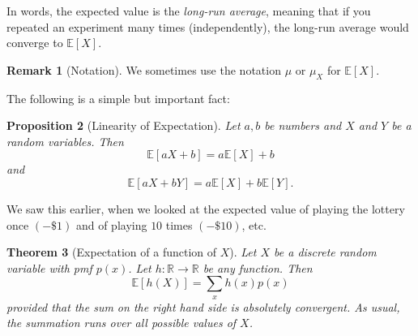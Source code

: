 \documentclass[10pt]{article}
\newtheorem{theorem}{Theorem}
\newtheorem{proposition}[theorem]{Proposition}
\theoremstyle{definition}
\newtheorem{remark}[theorem]{Remark}
\newcommand{\1}[1]{\textbf{1}_{\left[#1\right]}} %
\def\R{\mathbb{R}} %
\def\E{\mathbb{E}} %
\begin{document}
In words, the expected value is the \textit{long-run average}, meaning that if
you repeated an experiment many times (independently), the long-run average
would converge to $\E\left[X \right]$.

\begin{remark}[Notation]
  We sometimes use the notation $\mu$ or $\mu_{X}$ for $\E\left[X \right]$.
\end{remark}

The following is a simple but important fact:

\begin{proposition}[Linearity of Expectation]
  \label{prop:linearity-of-expectation}
  Let $a,b$ be numbers and $X$ and $Y$ be a random variables. Then
  \begin{equation*}
    \E\left[aX+b \right] = a \E\left[X \right] +b
  \end{equation*}
  and
  \begin{equation*}
    \E\left[aX+bY \right] = a\E\left[X \right]+ b\E\left[Y \right].
  \end{equation*}
\end{proposition}
We saw this earlier, when we looked at the expected value of playing the
lottery once $(-\$1)$ and of playing $10$ times $(-\$10)$, etc.

\begin{theorem}[Expectation of a function of $X$] 
  \label{thm:LOTUS-discrete-case}
  Let $X$ be a discrete random variable with pmf $p(x)$. Let $h:\R \to \R$ be any function. Then
  \begin{equation*}
    \E\left[h(X) \right] = \sum_{x} h(x)p(x) 
  \end{equation*}
  provided that the sum on the right hand side is absolutely convergent. As usual, the summation runs
  over all possible values of $X$.
\end{theorem}
\end{document}
